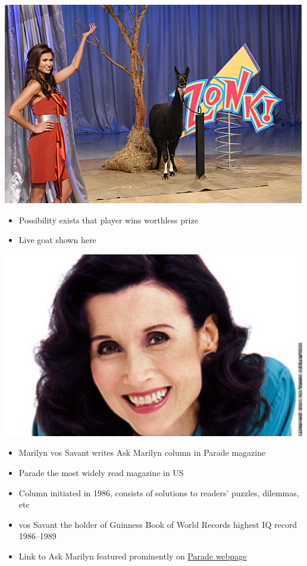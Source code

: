 \documentclass{beamer}
\theoremstyle{definition}
\begin{document}
\begin{frame}
\begin{center}\includegraphics[scale=1.25]{Goat}\end{center}
\begin{itemize}
\item Possibility exists that player wins worthless prize
\item Live goat shown here
\end{itemize}
\end{frame}

\begin{frame}
\begin{center}\includegraphics[scale=.5]{VosSavant}\end{center}
\begin{itemize}
\item Marilyn vos Savant writes \alert{Ask Marilyn}
column in \alert{Parade} magazine
\item Parade the most widely read magazine in US
\item Column initiated in 1986, consists of solutions
to readers' puzzles, dilemmas, etc
\item vos Savant the holder of \alert{Guinness Book of World Records}
highest IQ record 1986--1989
\item Link to \alert{Ask Marilyn} featured prominently on
\href{http://parade.com}{\color{blue}Parade webpage}
\end{itemize}
\end{frame}
\end{document}
